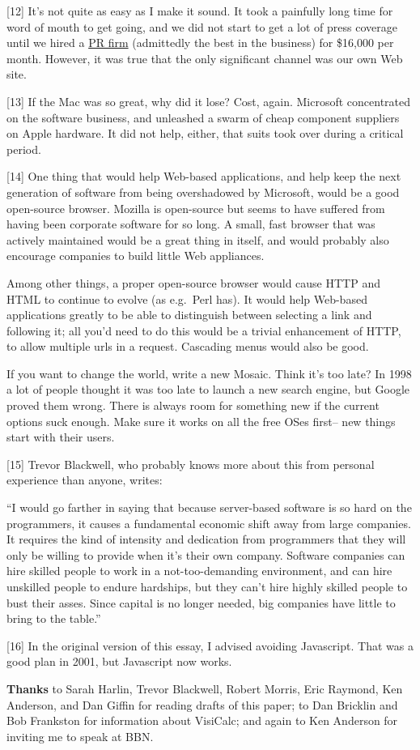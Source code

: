 {[}12{]} It's not quite as easy as I make it sound. It took a painfully
long time for word of mouth to get going, and we did not start to get a
lot of press coverage until we hired a
\href{http://www.schwartz-pr.com}{PR firm} (admittedly the best in the
business) for \$16,000 per month. However, it was true that the only
significant channel was our own Web site.

{[}13{]} If the Mac was so great, why did it lose? Cost, again.
Microsoft concentrated on the software business, and unleashed a swarm
of cheap component suppliers on Apple hardware. It did not help, either,
that suits took over during a critical period.

{[}14{]} One thing that would help Web-based applications, and help keep
the next generation of software from being overshadowed by Microsoft,
would be a good open-source browser. Mozilla is open-source but seems to
have suffered from having been corporate software for so long. A small,
fast browser that was actively maintained would be a great thing in
itself, and would probably also encourage companies to build little Web
appliances.

Among other things, a proper open-source browser would cause HTTP and
HTML to continue to evolve (as e.g.~Perl has). It would help Web-based
applications greatly to be able to distinguish between selecting a link
and following it; all you'd need to do this would be a trivial
enhancement of HTTP, to allow multiple urls in a request. Cascading
menus would also be good.

If you want to change the world, write a new Mosaic. Think it's too
late? In 1998 a lot of people thought it was too late to launch a new
search engine, but Google proved them wrong. There is always room for
something new if the current options suck enough. Make sure it works on
all the free OSes first-- new things start with their users.

{[}15{]} Trevor Blackwell, who probably knows more about this from
personal experience than anyone, writes:

``I would go farther in saying that because server-based software is so
hard on the programmers, it causes a fundamental economic shift away
from large companies. It requires the kind of intensity and dedication
from programmers that they will only be willing to provide when it's
their own company. Software companies can hire skilled people to work in
a not-too-demanding environment, and can hire unskilled people to endure
hardships, but they can't hire highly skilled people to bust their
asses. Since capital is no longer needed, big companies have little to
bring to the table.''

{[}16{]} In the original version of this essay, I advised avoiding
Javascript. That was a good plan in 2001, but Javascript now works.

\textbf{Thanks} to Sarah Harlin, Trevor Blackwell, Robert Morris, Eric
Raymond, Ken Anderson, and Dan Giffin for reading drafts of this paper;
to Dan Bricklin and Bob Frankston for information about VisiCalc; and
again to Ken Anderson for inviting me to speak at BBN.
